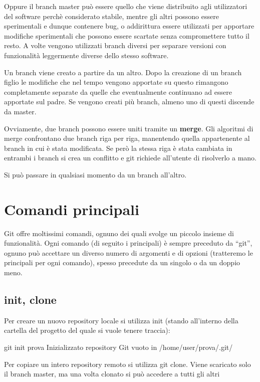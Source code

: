 \documentclass{article} \usepackage[textwidth=18cm,textheight=18cm]{geometry}
\begin{document}
Oppure il branch master può essere quello che viene distribuito agli
utilizzatori del software perchè considerato stabile, mentre gli altri possono
essere sperimentali e dunque contenere bug, o addirittura essere utilizzati per
apportare modifiche sperimentali che possono essere scartate senza compromettere
tutto il resto. A volte vengono utilizzati branch diversi per separare versioni
con funzionalità leggermente diverse dello stesso software.

Un branch viene creato a partire da un altro. Dopo la creazione di un branch
figlio le modifiche che nel tempo vengono apportate su questo rimangono
completamente separate da quelle che eventualmente continuano ad essere
apportate sul padre. Se vengono creati più branch, almeno uno di questi discende
da master.

Ovviamente, due branch possono essere uniti tramite un \textbf{merge}. Gli
algoritmi di merge confrontano due branch riga per riga, manentendo quella
appartenente al branch in cui è stata modificata. Se però la stessa riga è stata
cambiata in entrambi i branch si crea un conflitto e git richiede all'utente di 
risolverlo a mano.

Si può passare in qualsiasi momento da un branch all'altro.

\section{Comandi principali}

Git offre moltissimi comandi, ognuno dei quali svolge un piccolo insieme di
funzionalità. Ogni comando (di seguito i principali) è sempre preceduto da
``git'', ognuno può accettare un diverso numero di argomenti e di opzioni
(tratteremo le principali per ogni comando), spesso precedute da un singolo o da
un doppio meno. 

\subsection{init, clone}

Per creare un nuovo repository locale si utilizza init (stando all'interno
della cartella del progetto del quale si vuole tenere traccia):

git init prova Inizializzato repository Git vuoto in /home/user/prova/.git/

Per copiare un intero repository remoto si utilizza git clone. Viene scaricato
solo il branch master, ma una volta clonato si può accedere a tutti gli altri
\end{document}
